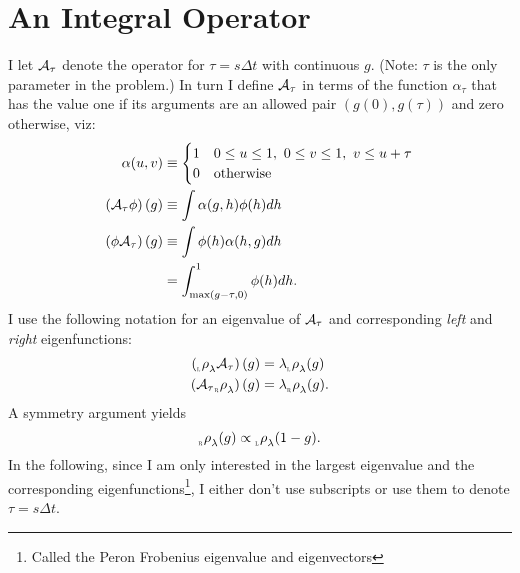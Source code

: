 \documentclass[12pt]{article} \usepackage{amsmath,amsfonts}
\newcommand{\Aop}{{\cal A}}
\newcommand{\Aindicate}{\alpha}
\newcommand{\slope}{s}
\newcommand{\function}{\phi}
\newcommand{\rightfunction}{{_{_{\scalebox{.4}{R}}} \rho}}
\newcommand{\leftfunction}{{_{_{\scalebox{.4}{L}}} \rho}}
\begin{document}
\section{An Integral Operator}
\label{sec:operator}

I let $\Aop_\tau$ denote the operator for $\tau = \slope \Delta t$
with continuous $g$.  (Note: $\tau$ is the only parameter in the
problem.)  In turn I define $\Aop_\tau$ in terms of the function
$\Aindicate_\tau$ that has the value one if its arguments are an
allowed pair $\left( g(0), g(\tau) \right)$ and zero otherwise, viz:
\begin{subequations}
  \begin{align}
    \label{eq:indicate}
    \Aindicate(u,v) &\equiv
    \begin{cases}
      1 & 0 \leq u \leq 1,~ 0 \leq v \leq 1,~ v \leq u + \tau\\
      0 & \text{otherwise}
    \end{cases}\\
    \label{eq:operateright}
    \left( \Aop_\tau  \function \right)(g) &\equiv \int
            \Aindicate(g,h) \function(h) dh \\
    \label{eq:operateleft}
    \left( \function \Aop_\tau \right)(g) &\equiv \int
           \function(h) \Aindicate(h,g) dh \\
    &= \int_{\max(g-\tau,0)}^1 \function(h) dh.
  \end{align}
\end{subequations}
I use the following notation for an eigenvalue of $\Aop_\tau$ and
corresponding \emph{left} and \emph{right} eigenfunctions:
\begin{align*}
 \left( \leftfunction_\lambda \Aop_\tau \right)(g) &= \lambda
 \leftfunction_\lambda (g)\\
 \left(\Aop_\tau  \rightfunction_\lambda \right)(g) &= \lambda
 \rightfunction_\lambda (g).
\end{align*}
A symmetry argument yields
\begin{equation}
  \label{eq:symmetry}
  \rightfunction_\lambda(g) \propto \leftfunction_\lambda(1-g).
\end{equation}
In the following, since I am only interested in the largest
eigenvalue and the corresponding eigenfunctions\footnote{Called
  the Peron Frobenius eigenvalue and eigenvectors}, I either don't use
subscripts or use them to denote $\tau=s\Delta t$.
\end{document}
